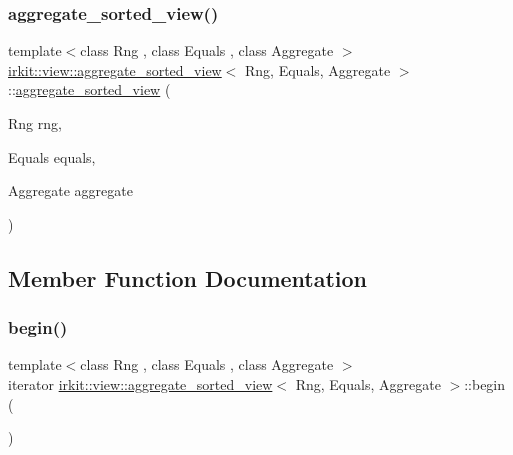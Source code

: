\subsubsection{\texorpdfstring{aggregate\+\_\+sorted\+\_\+view()}{aggregate\_sorted\_view()}}
{\footnotesize\ttfamily template$<$class Rng , class Equals , class Aggregate $>$ \\
\hyperlink{classirkit_1_1view_1_1aggregate__sorted__view}{irkit\+::view\+::aggregate\+\_\+sorted\+\_\+view}$<$ Rng, Equals, Aggregate $>$\+::\hyperlink{classirkit_1_1view_1_1aggregate__sorted__view}{aggregate\+\_\+sorted\+\_\+view} (\begin{DoxyParamCaption}\item[{Rng}]{rng,  }\item[{Equals}]{equals,  }\item[{Aggregate}]{aggregate }\end{DoxyParamCaption})\hspace{0.3cm}{\ttfamily [inline]}}



\subsection{Member Function Documentation}
\mbox{\label{classirkit_1_1view_1_1aggregate__sorted__view_a6e45f5ee40da2b8f4fed52e0b8fec8de}} 
\subsubsection{\texorpdfstring{begin()}{begin()}}
{\footnotesize\ttfamily template$<$class Rng , class Equals , class Aggregate $>$ \\
iterator \hyperlink{classirkit_1_1view_1_1aggregate__sorted__view}{irkit\+::view\+::aggregate\+\_\+sorted\+\_\+view}$<$ Rng, Equals, Aggregate $>$\+::begin (\begin{DoxyParamCaption}{ }\end{DoxyParamCaption})\hspace{0.3cm}{\ttfamily [inline]}}

\mbox{\label{classirkit_1_1view_1_1aggregate__sorted__view_ae49c7357a20d9b26eec64f28c2834585}} 
